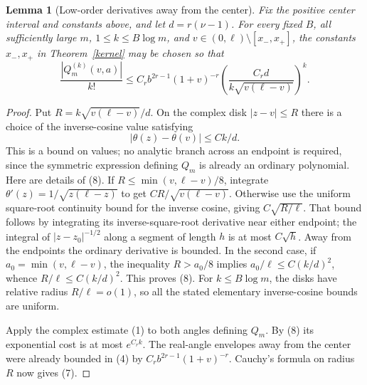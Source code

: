 \documentclass[11pt]{article}
\newtheorem{lemma}{Lemma}\newtheorem{theorem}{Theorem}
\begin{document}
\begin{lemma}[Low-order derivatives away from the center]\label{far}
Fix the positive center interval and constants above, and let
$d=r(\nu-1)$. For every fixed $B$, all sufficiently large $m$,
$1\le k\le B\log m$, and
$v\in(0,\ell)\setminus[x_-,x_+]$, the constants $x_-,x_+$ in
Theorem~\ref{kernel} may be chosen so that
\[
 \frac{|Q_m^{(k)}(v,a)|}{k!}
 \le C_r b^{2r-1}(1+v)^{-r}
          \left(\frac{C_r d}{k\sqrt{v(\ell-v)}}\right)^k. \tag{7}
\]
\end{lemma}
\begin{proof}
Put $R=k\sqrt{v(\ell-v)}/d$. On the complex disk $|z-v|\le R$
there is a choice of the inverse-cosine value satisfying
\[
 |\theta(z)-\theta(v)|\le Ck/d.                         \tag{8}
\]
This is a bound on values; no analytic branch across an endpoint is
required, since the symmetric expression defining $Q_m$ is already
an ordinary polynomial. Here are details of (8). If
$R\le\min(v,\ell-v)/8$, integrate
$\theta'(z)=1/\sqrt{z(\ell-z)}$ to get
$C R/\sqrt{v(\ell-v)}$. Otherwise use the uniform square-root
continuity bound for the inverse cosine, giving $C\sqrt{R/\ell}$.
That bound follows by integrating its inverse-square-root derivative
near either endpoint; the integral of $|z-z_0|^{-1/2}$ along a segment
of length $h$ is at most $C\sqrt h$. Away from the endpoints the
ordinary derivative is bounded. In the second case, if
$a_0=\min(v,\ell-v)$, the inequality $R>a_0/8$ implies
$a_0/\ell\le C(k/d)^2$, whence $R/\ell\le C(k/d)^2$.
This proves (8). For $k\le B\log m$, the disks have relative radius
$R/\ell=o(1)$, so all the stated elementary inverse-cosine bounds are uniform.

Apply the complex estimate (1) to both angles defining $Q_m$.
By (8) its exponential cost is at most $e^{C_r k}$.
The real-angle envelopes away from the center were already bounded
in (4) by $C_rb^{2r-1}(1+v)^{-r}$.
Cauchy's formula on radius $R$ now gives (7).
\end{proof}
\end{document}
